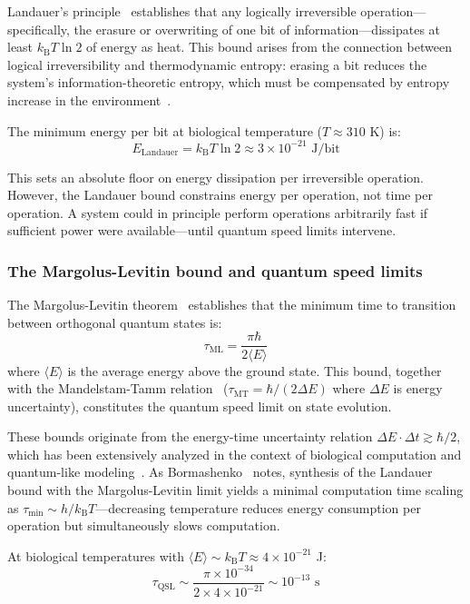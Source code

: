 \documentclass[12pt]{article}
\newcommand{\kB}{k_{\mathrm{B}}}
\begin{document}
Landauer's principle~\cite{landauer1961} establishes that any logically irreversible operation---specifically, the erasure or overwriting of one bit of information---dissipates at least $\kB T \ln 2$ of energy as heat. This bound arises from the connection between logical irreversibility and thermodynamic entropy: erasing a bit reduces the system's information-theoretic entropy, which must be compensated by entropy increase in the environment~\cite{bormashenko2024}.

The minimum energy per bit at biological temperature ($T \approx 310$ K) is:
\[
E_{\mathrm{Landauer}} = \kB T \ln 2 \approx 3 \times 10^{-21} \text{ J/bit}
\]

This sets an absolute floor on energy dissipation per irreversible operation. However, the Landauer bound constrains energy per operation, not time per operation. A system could in principle perform operations arbitrarily fast if sufficient power were available---until quantum speed limits intervene.

\subsubsection{The Margolus-Levitin bound and quantum speed limits}

The Margolus-Levitin theorem~\cite{margolus1998} establishes that the minimum time to transition between orthogonal quantum states is:
\[
\tau_{\mathrm{ML}} = \frac{\pi\hbar}{2\langle E \rangle}
\]
where $\langle E \rangle$ is the average energy above the ground state. This bound, together with the Mandelstam-Tamm relation~\cite{mandelstam1945} ($\tau_{\mathrm{MT}} = \hbar/(2\Delta E)$ where $\Delta E$ is energy uncertainty), constitutes the quantum speed limit on state evolution.

These bounds originate from the energy-time uncertainty relation $\Delta E \cdot \Delta t \gtrsim \hbar/2$, which has been extensively analyzed in the context of biological computation and quantum-like modeling~\cite{khrennikov2021,igamberdiev2025constraints,igamberdiev2026autopoietic}. As Bormashenko~\cite{bormashenko2024} notes, synthesis of the Landauer bound with the Margolus-Levitin limit yields a minimal computation time scaling as $\tau_{\min} \sim h/\kB T$---decreasing temperature reduces energy consumption per operation but simultaneously slows computation.

At biological temperatures with $\langle E \rangle \sim \kB T \approx 4 \times 10^{-21}$ J:
\[
\tau_{\mathrm{QSL}} \sim \frac{\pi \times 10^{-34}}{2 \times 4 \times 10^{-21}} \sim 10^{-13} \text{ s}
\]
\end{document}
